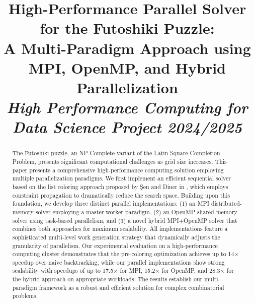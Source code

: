 \documentclass[10pt, conference]{IEEEtran}
\begin{document}


\title{High-Performance Parallel Solver for the Futoshiki Puzzle:\\
A Multi-Paradigm Approach using MPI, OpenMP, and Hybrid Parallelization\\
\normalsize \textit{High Performance Computing for Data Science Project 2024/2025}
}

\author{
\and
{}
\and
{}
}

\maketitle

\begin{abstract}

The Futoshiki puzzle, an NP-Complete variant of the Latin Square Completion Problem, presents significant computational challenges as grid size increases. This paper presents a comprehensive high-performance computing solution employing multiple parallelization paradigms. We first implement an efficient sequential solver based on the list coloring approach proposed by Şen and Diner in \cite{Sen2024Futoshiki}, which employs constraint propagation to dramatically reduce the search space. Building upon this foundation, we develop three distinct parallel implementations: (1) an MPI distributed-memory solver employing a master-worker paradigm, (2) an OpenMP shared-memory solver using task-based parallelism, and (3) a novel hybrid MPI+OpenMP solver that combines both approaches for maximum scalability. All implementations feature a sophisticated multi-level work generation strategy that dynamically adjusts the granularity of parallelism. Our experimental evaluation on a high-performance computing cluster demonstrates that the pre-coloring optimization achieves up to 14×  speedup over naive backtracking, while our parallel implementations show strong scalability with speedups of up to 17.5× for MPI, 15.2× for OpenMP, and 28.3× for the hybrid approach on appropriate workloads. The results establish our multi-paradigm framework as a robust and efficient solution for complex combinatorial problems.
\end{abstract}
\end{document}
